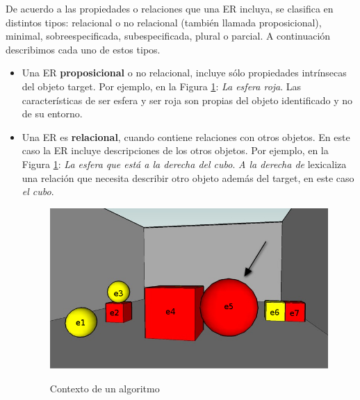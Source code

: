 De acuerdo a las propiedades o relaciones que una ER incluya, se clasifica en distintos tipos: relacional o no relacional (tambi\'en llamada proposicional), minimal, sobreespecificada, subespecificada, plural o parcial. A continuaci\'on describimos cada uno de estos tipos.
\begin{itemize}
\item Una ER {\bf proposicional} o no relacional, incluye s\'olo propiedades intr\'insecas del objeto target. Por ejemplo, en la Figura \ref{GRE3D7-stimulus}: {\it La esfera roja}. Las caracter\'isticas de ser esfera y ser roja son propias del objeto identificado y no de su entorno.

\item Una ER es {\bf relacional}, cuando contiene relaciones con otros objetos. En este caso la ER incluye descripciones de los otros objetos. Por ejemplo, en la Figura \ref{GRE3D7-stimulus}: {\it La esfera que est\'a a la derecha del cubo}. {\it A la derecha de} lexicaliza una relaci\'on que necesita describir otro objeto adem\'as del target, en este caso {\it el cubo}.

\begin{figure}[H]
\begin{minipage}[t]{0.5\linewidth}
\centering
\includegraphics[width=\textwidth]{images/22.jpg}\\[0pt]
\caption{Contexto de un algoritmo}
\label{GRE3D7-stimulus}
\vspace*{.1cm}
\end{minipage}
\hspace*{0cm}
\begin{minipage}[t]{0.5\linewidth}
\centering


\end{minipage}
\end{figure}
\end{itemize}
